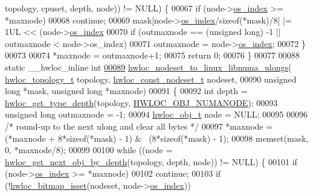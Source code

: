 \begin{DoxyCode}
      topology, cpuset, depth, node)) != NULL) \{
00067     \textcolor{keywordflow}{if} (node->\hyperlink{a00238_a61a7a80a68eaccbaaa28269e678c81a9}{os\_index} >= *maxnode)
00068       \textcolor{keywordflow}{continue};
00069     mask[node->\hyperlink{a00238_a61a7a80a68eaccbaaa28269e678c81a9}{os\_index}/\textcolor{keyword}{sizeof}(*mask)/8] |= 1UL << (node->\hyperlink{a00238_a61a7a80a68eaccbaaa28269e678c81a9}{os\_index} %
00070     \textcolor{keywordflow}{if} (outmaxnode == (\textcolor{keywordtype}{unsigned} \textcolor{keywordtype}{long}) -1 || outmaxnode < node->os\_index)
00071       outmaxnode = node->\hyperlink{a00238_a61a7a80a68eaccbaaa28269e678c81a9}{os\_index};
00072   \}
00073 
00074   *maxnode = outmaxnode+1;
00075   \textcolor{keywordflow}{return} 0;
00076 \}
00077 
00088 \textcolor{keyword}{static} \_\_hwloc\_inline \textcolor{keywordtype}{int}
\hyperlink{a00215_ga585ccf818d2f217f4e53f9c6506c3128}{00089} \hyperlink{a00215_ga585ccf818d2f217f4e53f9c6506c3128}{hwloc\_nodeset\_to\_linux\_libnuma\_ulongs}(
      \hyperlink{a00186_ga9d1e76ee15a7dee158b786c30b6a6e38}{hwloc\_topology\_t} topology, \hyperlink{a00183_ga2f5276235841ad66a79bedad16a5a10c}{hwloc\_const\_nodeset\_t} nodeset,
00090                                       \textcolor{keywordtype}{unsigned} \textcolor{keywordtype}{long} *mask, \textcolor{keywordtype}{unsigned} \textcolor{keywordtype}{long} *maxnode)
00091 \{
00092   \textcolor{keywordtype}{int} depth = \hyperlink{a00187_ga8bec782e21be313750da70cf7428b374}{hwloc\_get\_type\_depth}(topology, 
      \hyperlink{a00184_ggacd37bb612667dc437d66bfb175a8dc55a9d917a3e5497950c6d8948b8e183db5a}{HWLOC\_OBJ\_NUMANODE});
00093   \textcolor{keywordtype}{unsigned} \textcolor{keywordtype}{long} outmaxnode = -1;
00094   \hyperlink{a00238}{hwloc\_obj\_t} node = NULL;
00095 
00096   \textcolor{comment}{/* round-up to the next ulong and clear all bytes */}
00097   *maxnode = (*maxnode + 8*\textcolor{keyword}{sizeof}(*mask) - 1) & ~(8*\textcolor{keyword}{sizeof}(*mask) - 1);
00098   memset(mask, 0, *maxnode/8);
00099 
00100   \textcolor{keywordflow}{while} ((node = \hyperlink{a00187_gac140a9b939d9fa0b30c4a910efcb0656}{hwloc\_get\_next\_obj\_by\_depth}(topology, depth, node)) != NULL) \{
00101     \textcolor{keywordflow}{if} (node->\hyperlink{a00238_a61a7a80a68eaccbaaa28269e678c81a9}{os\_index} >= *maxnode)
00102       \textcolor{keywordflow}{continue};
00103     \textcolor{keywordflow}{if} (!\hyperlink{a00205_ga11340dd487f110bb84f0a6e4ae90bd06}{hwloc\_bitmap\_isset}(nodeset, node->\hyperlink{a00238_a61a7a80a68eaccbaaa28269e678c81a9}{os\_index}))

\end{DoxyCode}
